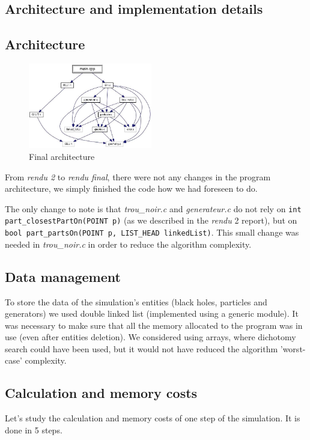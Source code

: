 \documentclass[a4paper]{article} %
\begin{document}
\begin{multicols*}{2}
\section{Architecture and implementation details}

\subsection{Architecture}
\begin{figure}[H]
\centering
\includegraphics[width=0.48\textwidth]{architecture.jpg}
\caption{Final architecture}
\end{figure}

From \emph{rendu 2} to \emph{rendu final}, there were not any changes in the
program architecture, we simply finished the code how we had foreseen to do.

The only change to note is that \emph{trou\_noir.c} and \emph{generateur.c} do not rely on \texttt{int part\_closestPartOn(POINT p)}
(as we described in the \emph{rendu }2 report), but on \texttt{bool part\_partsOn(POINT p, LIST\_HEAD linkedList)}.
This small change was needed in \emph{trou\_noir.c} in order to reduce the algorithm complexity.

\subsection{Data management}
To store the data of the simulation's entities (black holes, particles and generators)
we used double linked list (implemented using a generic module).
It was necessary to make sure that all the memory allocated to the program was in use (even after entities deletion).
We considered using arrays, where dichotomy search could have been used, but it would not have reduced the algorithm 'worst-case' complexity.

\subsection{Calculation and memory costs}
Let's study the calculation and memory costs of one step of the simulation.
It is done in 5 steps.


\end{multicols*}
\end{document}
